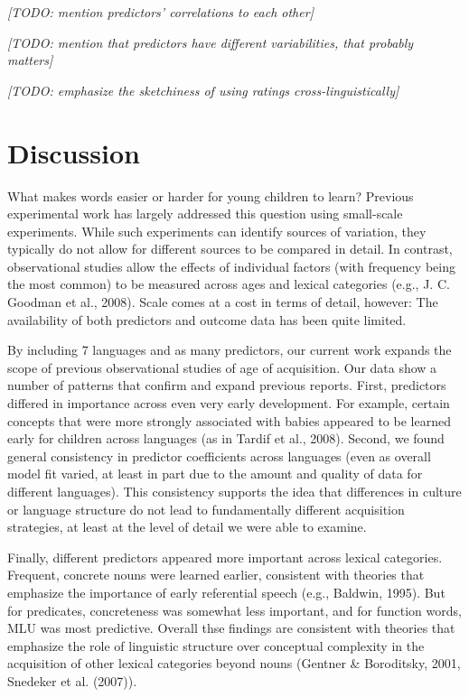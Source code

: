 \documentclass[10pt, letterpaper]{article}
\begin{document}
\emph{{[}TODO: mention predictors' correlations to each other{]}}

\emph{{[}TODO: mention that predictors have different variabilities,
that probably matters{]}}

\emph{{[}TODO: emphasize the sketchiness of using ratings
cross-linguistically{]}}

\section{Discussion}\label{discussion}

What makes words easier or harder for young children to learn? Previous
experimental work has largely addressed this question using small-scale
experiments. While such experiments can identify sources of variation,
they typically do not allow for different sources to be compared in
detail. In contrast, observational studies allow the effects of
individual factors (with frequency being the most common) to be measured
across ages and lexical categories (e.g., J. C. Goodman et al., 2008).
Scale comes at a cost in terms of detail, however: The availability of
both predictors and outcome data has been quite limited.

By including 7 languages and as many predictors, our current work
expands the scope of previous observational studies of age of
acquisition. Our data show a number of patterns that confirm and expand
previous reports. First, predictors differed in importance across even
very early development. For example, certain concepts that were more
strongly associated with babies appeared to be learned early for
children across languages (as in Tardif et al., 2008). Second, we found
general consistency in predictor coefficients across languages (even as
overall model fit varied, at least in part due to the amount and quality
of data for different languages). This consistency supports the idea
that differences in culture or language structure do not lead to
fundamentally different acquisition strategies, at least at the level of
detail we were able to examine.

Finally, different predictors appeared more important across lexical
categories. Frequent, concrete nouns were learned earlier, consistent
with theories that emphasize the importance of early referential speech
(e.g., Baldwin, 1995). But for predicates, concreteness was somewhat
less important, and for function words, MLU was most predictive. Overall
thse findings are consistent with theories that emphasize the role of
linguistic structure over conceptual complexity in the acquisition of
other lexical categories beyond nouns (Gentner \& Boroditsky, 2001,
Snedeker et al. (2007)).
\end{document}
